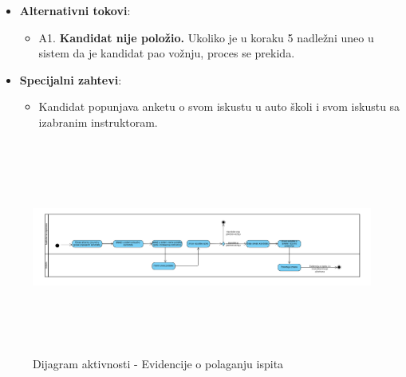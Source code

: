 \begin{itemize}
  \item \textbf{Alternativni tokovi}:
      \begin{itemize}
        \item A1. \textbf{Kandidat nije položio.}
        Ukoliko je u koraku 5 nadležni uneo u sistem da je kandidat pao vožnju, proces se prekida.
      \end{itemize}
      
  \item \textbf{Specijalni zahtevi}:
      \begin{itemize}
        \item Kandidat popunjava anketu o svom iskustu u auto školi i svom iskustu sa izabranim instruktoram.
      \end{itemize}
\end{itemize}

\begin{figure}[H]
  \begin{center}
      \includegraphics[width=140mm, height=70mm]{Diagrams/dijagram_aktivnosti_vodjenje evidencije.png}
  \end{center}
  \caption {Dijagram aktivnosti - Evidencije o polaganju ispita}
  \label{activity_evidencije_o_polaganju_ispita}

\end{figure}
